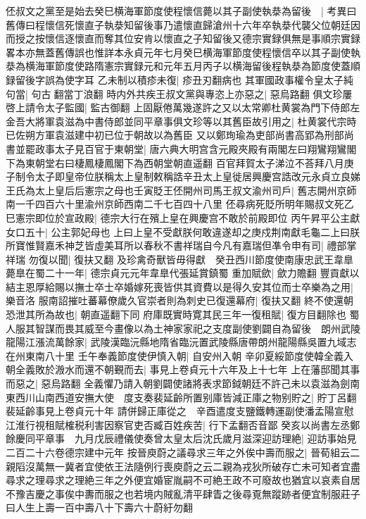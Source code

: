 伾叔文之黨至是始去癸巳横海軍節度使程懷信薨以其子副使執㳟為留後　|{
	考異曰舊傳曰程懷信死懷直子執㳟知留後事乃遣懷直歸滄州十六年卒執㳟代襲父位朝廷因而授之按懷信逐懷直而奪其位安肯以懷直之子知留後又德宗實録俱無是事順宗實録畧本亦無蓋舊傳誤也惟詳本永貞元年七月癸巳横海軍節度使程懷信卒以其子副使執㳟為横海軍節度使路隋憲宗實録元和元年五月丙子以横海留後程執㳟為節度使蓋順録留後字誤為使字耳}
乙未制以積疹未復|{
	疹丑刃翻病也}
其軍國政事權令皇太子純句當|{
	句古翻當丁浪翻}
時内外共疾王叔文黨與專恣上亦惡之|{
	惡烏路翻}
俱文珍屢啓上請令太子監國|{
	監古御翻}
上固厭倦萬幾遂許之又以太常卿杜黄裳為門下侍郎左金吾大將軍袁滋為中書侍郎並同平章事俱文珍等以其舊臣故引用之|{
	杜黄裳代宗時已佐朔方軍袁滋建中初已位于朝故以為舊臣}
又以鄭珣瑜為吏部尚書高郢為刑部尚書並罷政事太子見百官于東朝堂|{
	唐六典大明宫含元殿夾殿有兩閣左曰翔鸞翔鸞閣下為東朝堂右曰棲鳳棲鳳閣下為西朝堂朝直遥翻}
百官拜賀太子涕泣不荅拜八月庚子制令太子即皇帝位朕稱太上皇制敕稱誥辛丑太上皇徙居興慶宫誥改元永貞立良娣王氏為太上皇后后憲宗之母也壬寅貶王伾開州司馬王叔文渝州司戶|{
	舊志開州京師南一千四百六十里渝州京師西南二千七百四十八里}
伾尋病死貶所明年賜叔文死乙巳憲宗即位於宣政殿|{
	德宗大行在殯上皇在興慶宫不敢於前殿即位}
丙午昇平公主獻女口五十|{
	公主郭妃母也}
上曰上皇不受獻朕何敢違遂却之庚戍荆南獻毛龜二上曰朕所寶惟賢嘉禾神芝皆虛美耳所以春秋不書祥瑞自今凡有嘉瑞但凖令申有司|{
	禮部掌祥瑞}
勿復以聞|{
	復扶又翻}
及珍禽奇獸皆毋得獻　癸丑西川節度使南康忠武王韋臯薨臯在蜀二十一年|{
	德宗貞元元年韋臯代張延賞鎮蜀}
重加賦歛|{
	歛力贍翻}
豐貢獻以結主恩厚給賜以撫士卒士卒婚嫁死喪皆供其資費以是得久安其位而士卒樂為之用|{
	樂音洛}
服南詔摧吐蕃幕僚歲久官崇者則為刺史已復還幕府|{
	復扶又翻}
終不使還朝恐泄其所為故也|{
	朝直遥翻下同}
府庫既實時寛其民三年一復租賦|{
	復方目翻除也}
蜀人服其智謀而畏其威至今畫像以為土神家家祀之支度副使劉闢自為留後　朗州武陵龍陽江漲流萬餘家|{
	武陵漢臨沅縣地隋省臨沅置武陵縣唐帶朗州龍陽縣吳置九域志在州東南八十里}
壬午奉義節度使伊慎入朝|{
	自安州入朝}
辛卯夏綏節度使韓全義入朝全義敗於溵水而還不朝覲而去|{
	事見上卷貞元十六年及上十七年}
上在藩邸聞其事而惡之|{
	惡烏路翻}
全義懼乃請入朝劉闢使諸將表求節鉞朝廷不許己未以袁滋為劍南東西川山南西道安撫大使　度支奏裴延齡所置别庫皆減正庫之物别貯之|{
	貯丁呂翻裴延齡事見上卷貞元十年}
請併歸正庫從之　辛酉遣度支鹽鐵轉運副使潘孟陽宣慰江淮行視租賦榷税利害因察官吏否臧百姓疾苦|{
	行下孟翻否音鄙}
癸亥以尚書左丞鄭餘慶同平章事　九月戊辰禮儀使奏曾太皇太后沈氏歲月滋深迎訪理絶|{
	迎訪事始見二百二十六卷德宗建中元年}
按晉庾蔚之議尋求三年之外俟中壽而服之|{
	晉荀組云二親䧟沒萬無一冀者宜使依王法隨例行喪庾蔚之云二親為戎狄所破存亡未可知者宜盡尋求之理尋求之理絶三年之外便宜婚宦胤嗣不可絶王政不可廢故也猶宜以哀素自居不豫吉慶之事俟中夀而服之也若境内賊亂清平肆眚之後尋覔無蹤跡者便宜制服莊子曰人生上壽一百中壽八十下壽六十蔚紆勿翻}
